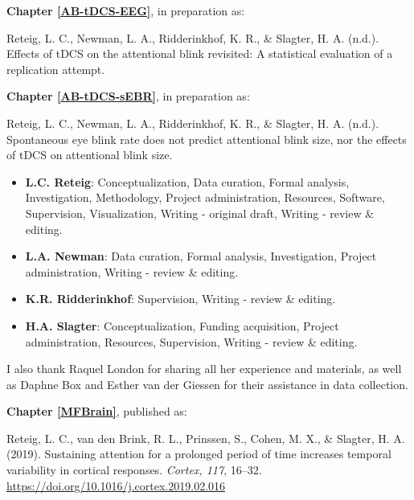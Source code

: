 \documentclass[11pt,english,]{memoir}
\providecommand{\tightlist}{%
  \setlength{\itemsep}{0pt}\setlength{\parskip}{0pt}}
\begin{document}
\textbf{Chapter \ref{AB-tDCS-EEG}}, in preparation as:

Reteig, L. C., Newman, L. A., Ridderinkhof, K. R., \& Slagter, H. A. (n.d.). Effects of tDCS on the attentional blink revisited: A statistical evaluation of a replication attempt.

\textbf{Chapter \ref{AB-tDCS-sEBR}}, in preparation as:

Reteig, L. C., Newman, L. A., Ridderinkhof, K. R., \& Slagter, H. A. (n.d.). Spontaneous eye blink rate does not predict attentional blink size, nor the effects of tDCS on attentional blink size.

\begin{itemize}
\tightlist
\item
  \textbf{L.C. Reteig}: Conceptualization, Data curation, Formal analysis, Investigation, Methodology, Project administration, Resources, Software, Supervision, Visualization, Writing - original draft, Writing - review \& editing.
\item
  \textbf{L.A. Newman}: Data curation, Formal analysis, Investigation, Project administration, Writing - review \& editing.
\item
  \textbf{K.R. Ridderinkhof}: Supervision, Writing - review \& editing.
\item
  \textbf{H.A. Slagter}: Conceptualization, Funding acquisition, Project administration, Resources, Supervision, Writing - review \& editing.
\end{itemize}

\begin{list}{}{\leftmargin=1.5em\rightmargin=0pt}
\item
I also thank Raquel London for sharing all her experience and materials, as well as Daphne Box and Esther van der Giessen for their assistance in data collection.\newline
\end{list}

\textbf{Chapter \ref{MFBrain}}, published as:

Reteig, L. C., van den Brink, R. L., Prinssen, S., Cohen, M. X., \& Slagter, H. A. (2019). Sustaining attention for a prolonged period of time increases temporal variability in cortical responses. \emph{Cortex, 117}, 16--32. \url{https://doi.org/10.1016/j.cortex.2019.02.016}
\end{document}
